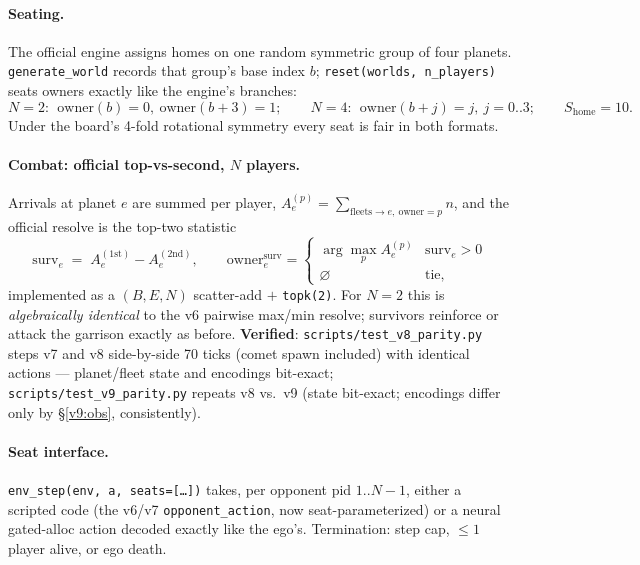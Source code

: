 \documentclass[11pt]{article}
\newcommand{\cd}[1]{\texttt{#1}}
\begin{document}
\paragraph{Seating.} The official engine assigns homes on one random symmetric group of four
planets. \cd{generate\_world} records that group's base index $b$; \cd{reset(worlds, n\_players)}
seats owners exactly like the engine's branches:
\[
N{=}2:\ \ \text{owner}(b)=0,\ \text{owner}(b{+}3)=1;\qquad
N{=}4:\ \ \text{owner}(b{+}j)=j,\ j=0..3;\qquad
S_{\text{home}}=10 .
\]
Under the board's 4-fold rotational symmetry every seat is fair in both formats.

\paragraph{Combat: official top-vs-second, $N$ players.} Arrivals at planet $e$ are summed per
player, $A_e^{(p)}=\sum_{\text{fleets}\to e,\ \text{owner}=p}n$, and the official resolve is the
top-two statistic
\begin{equation}
\text{surv}_e \;=\; A_e^{(1\text{st})}-A_e^{(2\text{nd})},\qquad
\text{owner}^{\text{surv}}_e=\begin{cases}\arg\max_p A_e^{(p)} & \text{surv}_e>0\\[2pt]
\varnothing & \text{tie},\end{cases}
\end{equation}
implemented as a $(B,E,N)$ scatter-add $+$ \cd{topk(2)}. For $N{=}2$ this is \emph{algebraically
identical} to the v6 pairwise max/min resolve; survivors reinforce or attack the garrison exactly as
before. \textbf{Verified}: \cd{scripts/test\_v8\_parity.py} steps v7 and v8 side-by-side 70 ticks
(comet spawn included) with identical actions --- planet/fleet state and encodings bit-exact;
\cd{scripts/test\_v9\_parity.py} repeats v8 vs.\ v9 (state bit-exact; encodings differ only by
\S\ref{v9:obs}, consistently).

\paragraph{Seat interface.} \cd{env\_step(env, a, seats=[\dots])} takes, per opponent pid
$1..N{-}1$, either a scripted code (the v6/v7 \cd{opponent\_action}, now seat-parameterized) or a
neural gated-alloc action decoded exactly like the ego's. Termination: step cap, $\le\!1$ player
alive, or ego death.

\end{document}
